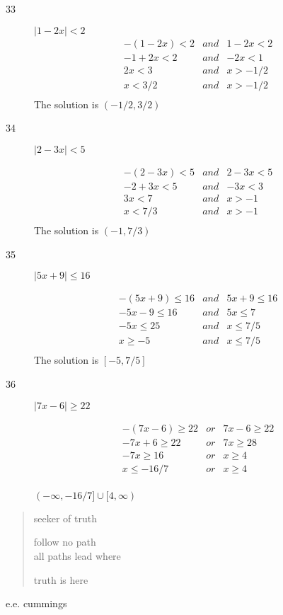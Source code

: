 \documentclass[letterpaper]{exam}
\begin{document}
\begin{description}
      \item[33]

      \( | 1 - 2x | < 2 \)
      \begin{align*}
        -(1 - 2x) < 2 &and& 1 - 2x < 2 \\
        -1 + 2x < 2 &and& -2x < 1 \\
        2x < 3 &and& x > -1/2 \\
        x < 3/2 &and& x > -1/2 \\
      \end{align*}
      The solution is \( (-1/2, 3/2) \)

      \item[34]

      \( | 2 - 3x | < 5 \)

      \begin{align*}
        -(2 - 3x) < 5 &and& 2 - 3x < 5 \\
        -2 + 3x < 5 &and& -3x < 3 \\
        3x < 7 &and& x > -1 \\
        x < 7/3 &and& x > -1 \\
      \end{align*}
      The solution is \( (-1, 7/3) \)

      \item[35]

      \( | 5x + 9 | \leq 16 \)

      \begin{align*}
        -(5x + 9) \leq 16 &and& 5x + 9 \leq 16 \\
        -5x - 9 \leq 16 &and& 5x \leq 7 \\
        -5x \leq 25 &and& x \leq 7/5 \\
        x \geq -5 &and& x \leq 7/5 \\
      \end{align*}
      The solution is \( [-5, 7/5] \)

      \item[36]

      \( | 7x - 6 | \geq 22 \)

      \begin{align*}
        -(7x - 6) \geq 22 & or & 7x - 6 \geq 22 \\
        -7x + 6 \geq 22   & or & 7x \geq 28 \\
        -7x \geq 16       & or & x \geq 4 \\
        x \leq -16/7      & or & x \geq 4 \\
      \end{align*}

      $\boxed{ (-\infty, -16/7] \cup [4, \infty) }$

    \end{description}
  \fi


  \ifprintanswers{}
  \else
  \vspace{5 in}

  \begin{verse}
  seeker of truth

  follow no path \\
  all paths lead where

  truth is here 
  \end{verse}
  \hspace{1 in} e.e. cummings

  \fi
\end{document}
